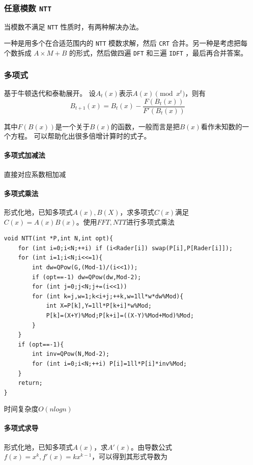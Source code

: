 \documentclass[UTF-8]{ctexart}
\begin{document}
	\subsubsection{任意模数 \texttt{NTT}}
	当模数不满足 \texttt{NTT} 性质时，有两种解决办法。
	
	一种是用多个在合适范围内的 \texttt{NTT} 模数求解，然后 \texttt{CRT} 合并。另一种是考虑把每个数拆成 $A \times M+B$ 的形式，然后做四遍 \texttt{DFT} 和三遍 \texttt{IDFT} ，最后再合并答案。
	
	\subsubsection{多项式}
	基于牛顿迭代和泰勒展开。
	设$A _ t(x)$表示$A(x) \pmod{x^{t}}$，则有
	$$B _ {t+1}(x)=B _ t(x)-\frac{F(B _ t(x))}{F'(B _ t(x))}$$
	
	其中$F(B(x))$是一个关于$B(x)$的函数，一般而言是把$B(x)$看作未知数的一个方程。  
	可以帮助化出很多倍增计算时的式子。
	
	\paragraph{多项式加减法} 直接对应系数相加减
	
	\paragraph{多项式乘法} 形式化地，已知多项式$A(x),B(X)$，求多项式$C(x)$满足$C(x)=A(x)B(x)$。使用$FFT,NTT$进行多项式乘法
\begin{verbatim}
void NTT(int *P,int N,int opt){
    for (int i=0;i<N;++i) if (i<Rader[i]) swap(P[i],P[Rader[i]]);
    for (int i=1;i<N;i<<=1){
        int dw=QPow(G,(Mod-1)/(i<<1));
        if (opt==-1) dw=QPow(dw,Mod-2);
        for (int j=0;j<N;j+=(i<<1))
        for (int k=j,w=1;k<i+j;++k,w=1ll*w*dw%Mod){
            int X=P[k],Y=1ll*P[k+i]*w%Mod;
            P[k]=(X+Y)%Mod;P[k+i]=((X-Y)%Mod+Mod)%Mod;
        }
    }
    if (opt==-1){
        int inv=QPow(N,Mod-2);
        for (int i=0;i<N;++i) P[i]=1ll*P[i]*inv%Mod;
    }
    return;
}
\end{verbatim}
	时间复杂度$O(nlogn)$
	
	\paragraph{多项式求导}形式化地，已知多项式$A(x)$，求$A'(x)$。由导数公式$f(x)=x^k,f'(x)=kx^{k-1}$，可以得到其形式导数为
	
\end{document}
